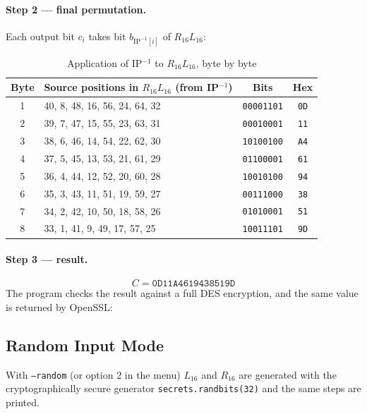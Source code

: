 \documentclass[12pt,a4paper]{article}
\begin{document}
\paragraph{Step 2 — final permutation.} Each output bit $c_i$ takes bit $b_{\mathrm{IP}^{-1}[i]}$
of $R_{16}L_{16}$:
\begin{table}[H]
\centering
\caption{Application of IP$^{-1}$ to $R_{16}L_{16}$, byte by byte}
\begin{tabular}{clcc}
\toprule
Byte & Source positions in $R_{16}L_{16}$ (from IP$^{-1}$) & Bits & Hex \\
\midrule
1 & 40, 8, 48, 16, 56, 24, 64, 32 & \texttt{00001101} & \texttt{0D} \\
2 & 39, 7, 47, 15, 55, 23, 63, 31 & \texttt{00010001} & \texttt{11} \\
3 & 38, 6, 46, 14, 54, 22, 62, 30 & \texttt{10100100} & \texttt{A4} \\
4 & 37, 5, 45, 13, 53, 21, 61, 29 & \texttt{01100001} & \texttt{61} \\
5 & 36, 4, 44, 12, 52, 20, 60, 28 & \texttt{10010100} & \texttt{94} \\
6 & 35, 3, 43, 11, 51, 19, 59, 27 & \texttt{00111000} & \texttt{38} \\
7 & 34, 2, 42, 10, 50, 18, 58, 26 & \texttt{01010001} & \texttt{51} \\
8 & 33, 1, 41, 9, 49, 17, 57, 25 & \texttt{10011101} & \texttt{9D} \\
\bottomrule
\end{tabular}
\end{table}

\paragraph{Step 3 — result.}
\[
\boxed{C = \texttt{0D11A4619438519D}}
\]
The program checks the result against a full DES encryption, and the same value is returned by
OpenSSL:
\begin{terminal}
\end{terminal}

\subsection{Random Input Mode}
With \texttt{--random} (or option 2 in the menu) $L_{16}$ and $R_{16}$ are generated with the
cryptographically secure generator \texttt{secrets.randbits(32)} and the same steps are printed.
\end{document}
